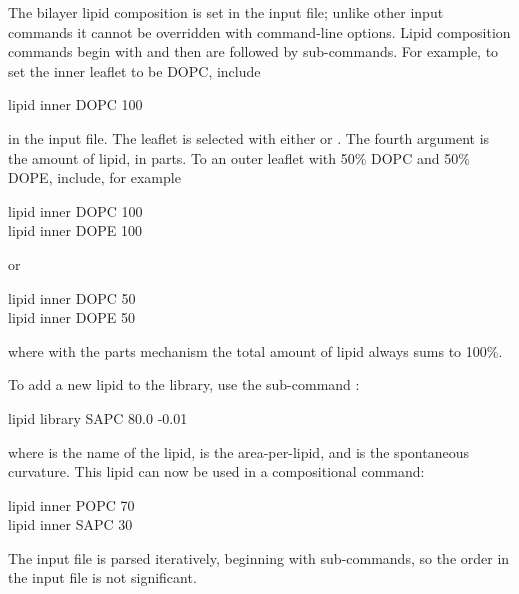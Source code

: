 
 \label{sec:lipid_comp}

The bilayer lipid composition is set in the input file; unlike other input commands it cannot be overridden with command-line options.
Lipid composition commands begin with  and then are followed by sub-commands.
For example, to set the inner leaflet to be DOPC, include
\begin{icommand}
lipid inner DOPC 100
\end{icommand}
in the input file.
The leaflet is selected with either  or . 
The fourth argument is the amount of lipid, in parts.
To an outer leaflet with 50\% DOPC and 50\% DOPE, include, for example 
\begin{icommand}
lipid inner DOPC 100 \\
lipid inner DOPE 100
\end{icommand}
or
\begin{icommand}
lipid inner DOPC 50 \\
lipid inner DOPE 50
\end{icommand}
where with the parts mechanism the total amount of lipid always sums to 100\%.

To add a new lipid to the library, use the sub-command :
\begin{icommand}
lipid library SAPC 80.0 -0.01
\end{icommand}
where  is the name of the lipid,  is the area-per-lipid, and  is the spontaneous curvature.
This lipid can now be used in a compositional command:
\begin{icommand}
lipid inner POPC 70 \\
lipid inner SAPC 30
\end{icommand}
The input file is parsed iteratively, beginning with  sub-commands, so the order in the input file is not significant.

%
%
%



